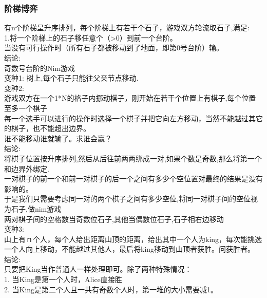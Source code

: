 \documentclass[10pt]{ctexart}
\begin{document}
{{\subsubsection{阶梯博弈}
有n个阶梯呈升序排列，每个阶梯上有若干个石子，游戏双方轮流取石子,满足:\\
1.将一个阶梯上的石子移任意个（>0）到前一个台阶。\\
当没有可行操作时（所有石子都被移动到了地面，即第0号台阶）输。\\
结论:\\
奇数号台阶的Nim游戏\\
变种1:
树上,每个石子只能往父亲节点移动.\\
变种2:\\
游戏双方在一个1*N的格子内挪动棋子，刚开始在若干个位置上有棋子,每个位置至多一个棋子\\
每一个选手可以进行的操作时选择一个棋子并把它向左方移动，当然不能越过其它的棋子，也不能超出边界。\\
谁不能移动谁就输了。求谁会赢？\\
结论:\\
将棋子位置按升序排列,然后从后往前两两绑成一对,如果个数是奇数,那么将第一个和边界外绑定.\\
一对棋子的前一个和前一对棋子的后一个之间有多少个空位置对最终的结果是没有影响的。\\
于是我们只需要考虑同一对的两个棋子之间有多少空位,将同一对棋子间的空位视为石子,做nim游戏\\
两对棋子间的空格数当奇数位石子,其他当偶数位石子,石子相右边移动\\
变种3:\\
山上有ｎ个人，每个人给出距离山顶的距离，给出其中一个人为king，每次能挑选一个人向上移动，不能越过其他人，最后将king移动到山顶者获胜。问获胜者。\\
结论:\\
只要把King当作普通人一样处理即可。除了两种特殊情况：\\
1. 当King是第一个人时，Alice直接胜\\
2. 当King是第二个人且一共有奇数个人时，第一堆的大小需要减1。\\
}}
\end{document}
